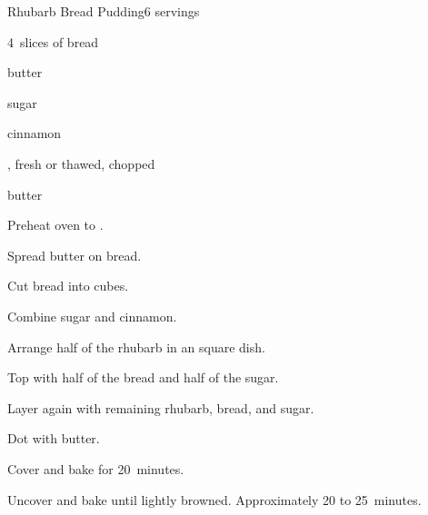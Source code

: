 \begin{recipe}{Rhubarb Bread Pudding}{}{6 servings}

\begin{ingredients}
\item 4~slices of bread
\item {} butter
\item {} sugar
\item \tp{\half} cinnamon
\item {} , fresh or thawed, chopped
\item \Tp{1\twothird} butter
\end{ingredients}

\begin{directions}
\item Preheat oven to .
\item Spread butter on bread.
\item Cut bread into \inch{\half} cubes.
\item Combine sugar and cinnamon.
\item Arrange half of the rhubarb in an  square dish.
\item Top with half of the bread and half of the sugar.
\item Layer again with remaining rhubarb, bread, and sugar.
\item Dot with butter.
\item Cover and bake for 20~minutes.
\item Uncover and bake until lightly browned. Approximately 20 to 25~minutes.
\end{directions}

\end{recipe}
